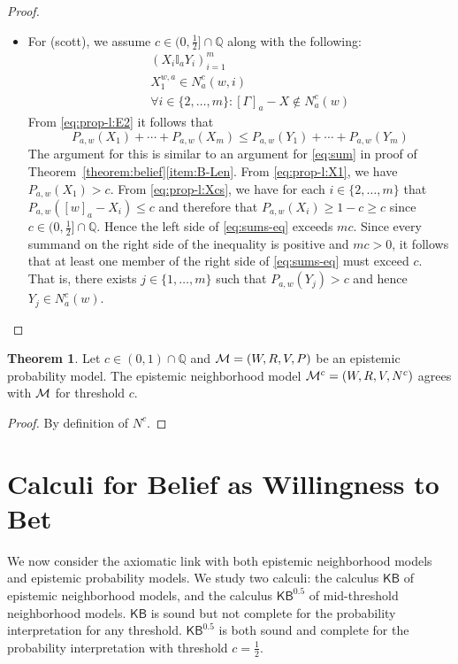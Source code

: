 \documentclass[12pt]{article}
\theoremstyle{definition}
\newtheorem{theorem}{Theorem}[section]
\newcommand{\Rat}{\mathbb{Q}}  %
\newcommand{\M}{{\cal M}}      %
\newcommand{\KB}{{\mathsf{KB}}}                        %
\newcommand{\KBeq}{{\mathsf{KB}^{\mathsf{0.5}}}}       %
\begin{document}
\begin{proof}
\begin{itemize}
  \item For (scott), we assume $c\in(0,\frac 12]\cap\Rat$ along with the
    following:
    \begin{eqnarray}
      &&
      (X_i\mathbb{I}_aY_i)_{i=1}^m
      \label{eq:prop-l:E2} 
      \\ &&
      X_1^{w,a}\in N^c_a(w,i) 
      \label{eq:prop-l:X1} 
      \\ && 
      \forall i\in\{2,\dots,m\}: [\Gamma]_a-X\notin N^c_a(w) 
      \label{eq:prop-l:Xcs} 
    \end{eqnarray}
    From \eqref{eq:prop-l:E2} it follows that
    \begin{equation}
      P_{a,w} (X_1)+\cdots+P_{a,w}(X_m)\leq
      P_{a,w}(Y_1)+\cdots+ P_{a,w}(Y_m)
      \label{eq:sums-eq}
    \end{equation}
    The argument for this is similar to an argument for \eqref{eq:sum}
    in proof of Theorem~\ref{theorem:belief}\eqref{item:B-Len}.  From
    \eqref{eq:prop-l:X1}, we have $P_{a,w}(X_1)>c$.  From
    \eqref{eq:prop-l:Xcs}, we have for each $i\in\{2,\dots,m\}$ that
    $P_{a,w}([w]_a-X_i)\leq c$ and therefore that $P_{a,w}(X_i)\geq
    1-c\geq c$ since $c\in(0,\frac 12]\cap\Rat$.  Hence the left side
    of \eqref{eq:sums-eq} exceeds $mc$.  Since every summand on the
    right side of the inequality is positive and $mc>0$, it follows
    that at least one member of the right side of \eqref{eq:sums-eq}
    must exceed $c$.  That is, there exists $j\in\{1,\dots,m\}$ such
    that $P_{a,w}(Y_j) > c$ and hence $Y_j\in N^c_a(w)$.  \qedhere
  \end{itemize}
\end{proof}

\begin{theorem}
  Let $c\in(0,1)\cap\Rat$ and $\M=(W,R,V,P)$ be an epistemic
  probability model. The epistemic neighborhood model
  $\M^c=(W,R,V,N^c)$ agrees with $\M$ for threshold $c$.
\end{theorem}
\begin{proof}
  By definition of $N^c$.
\end{proof}

\section{Calculi for Belief as Willingness to Bet}
\label{Section:Calculi}

We now consider the axiomatic link with both epistemic neighborhood
models and epistemic probability models.  We study two calculi: the
calculus $\KB$ of epistemic neighborhood models, and the calculus
$\KBeq$ of mid-threshold neighborhood models.  $\KB$ is sound but not
complete for the probability interpretation for any threshold.
$\KBeq$ is both sound and complete for the probability interpretation
with threshold $c=\frac 12$.
\end{document}
